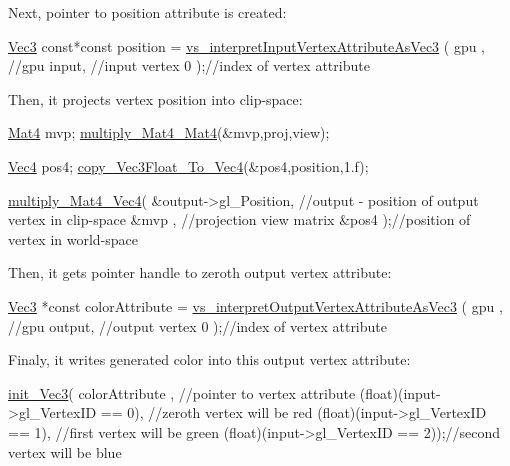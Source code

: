 Next, pointer to position attribute is created\+: 
\begin{DoxyCodeInclude}
  \hyperlink{structVec3}{Vec3} \textcolor{keyword}{const}*\textcolor{keyword}{const} position = \hyperlink{program_8h_a4bec56307c0d080bf314d20ff89773b2}{vs\_interpretInputVertexAttributeAsVec3}
      (
      gpu  , \textcolor{comment}{//gpu}
      input, \textcolor{comment}{//input vertex}
      0    );\textcolor{comment}{//index of vertex attribute}
\end{DoxyCodeInclude}
Then, it projects vertex position into clip-\/space\+: 
\begin{DoxyCodeInclude}
  \hyperlink{structMat4}{Mat4} mvp;
  \hyperlink{linearAlgebra_8c_ab490710375f17e4c453720b4f3a6de1f}{multiply\_Mat4\_Mat4}(&mvp,proj,view);

  \hyperlink{structVec4}{Vec4} pos4;
  \hyperlink{linearAlgebra_8c_aa6574ab0f21fd2161a67abef60544177}{copy\_Vec3Float\_To\_Vec4}(&pos4,position,1.f);

  \hyperlink{linearAlgebra_8c_ac2909e84e7ff2328f4022195c670f098}{multiply\_Mat4\_Vec4}(
      &output->gl\_Position, \textcolor{comment}{//output - position of output vertex in clip-space}
      &mvp                , \textcolor{comment}{//projection view matrix}
      &pos4               );\textcolor{comment}{//position of vertex in world-space}
\end{DoxyCodeInclude}
Then, it gets pointer handle to zeroth output vertex attribute\+: 
\begin{DoxyCodeInclude}
  \hyperlink{structVec3}{Vec3} *\textcolor{keyword}{const} colorAttribute = \hyperlink{program_8h_a60d0546dc8c052ee90f699ddca3b540b}{vs\_interpretOutputVertexAttributeAsVec3}
      (
      gpu   , \textcolor{comment}{//gpu}
      output, \textcolor{comment}{//output vertex}
      0     );\textcolor{comment}{//index of vertex attribute}
\end{DoxyCodeInclude}
Finaly, it writes generated color into this output vertex attribute\+: 
\begin{DoxyCodeInclude}
  \hyperlink{linearAlgebra_8c_a898abc01a7905b120121d45afaba6635}{init\_Vec3}(
      colorAttribute                  , \textcolor{comment}{//pointer to vertex attribute}
      (\textcolor{keywordtype}{float})(input->gl\_VertexID == 0), \textcolor{comment}{//zeroth vertex will be red}
      (\textcolor{keywordtype}{float})(input->gl\_VertexID == 1), \textcolor{comment}{//first vertex will be green}
      (\textcolor{keywordtype}{float})(input->gl\_VertexID == 2));\textcolor{comment}{//second vertex will be blue}
\end{DoxyCodeInclude}
